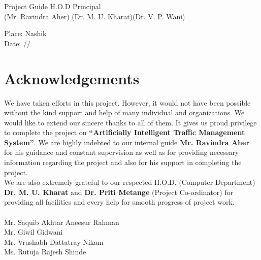 \documentclass[openany,12pt]{report}
\begin{document}
	\hspace{0.1in} Project Guide  \hspace{1.5in}H.O.D \hspace{01.5in} Principal  \\
	\hspace{0.8in} (Mr. Ravindra Aher) \hspace{0.85in}(Dr. M. U. Kharat)\hspace{0.9in}(Dr. V. P. Wani)\\
	\vspace{0.2in}
	
	\begin{flushleft}
	{Place: Nashik}\\	
	{Date: \hspace{0.2 in}/\hspace{0.3 in}/}   \\
	\end{flushleft}		
	\newpage {}
	\chapter*{Acknowledgements}
	
	\hspace*{0.5 in}We have taken efforts in this project. However, it would not have been possible without the kind support and help of many individual and organizations. We would like to extend our sincere thanks to all of them. It gives us proud privilege to complete the project on \textbf{ ``Artificially Intelligent Traffic Management System''}. We are highly indebted to our internal guide \textbf{Mr. Ravindra Aher} for his guidance and constant supervision as well as for providing necessary information regarding the project and also for his support in completing the project.\\
	
	\hspace*{0.5 in}We are also extremely grateful to our respected H.O.D. (Computer Department) \textbf{Dr. M. U. Kharat} and \textbf{Dr. Priti Metange} (Project Co-ordinator) for providing all facilities and every help for smooth progress of project work.\\
	\\
	\hspace*{3.5 in}Mr. Saquib Akhtar Aneesur Rahman\\
	\hspace*{3.5 in}Mr. Giwil Gidwani \\
	\hspace*{3.5 in}Mr. Vrushabh Dattatray Nikam\\
	\hspace*{3.5 in}Ms. Rutuja Rajesh Shinde
	
\end{document}
